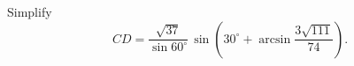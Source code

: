 Simplify
\[
CD=\dfrac{\sqrt{37}}{\sin60^\circ}\,\sin\left(30^\circ+\arcsin\dfrac{3\sqrt{111}}{74}\right).
\]
